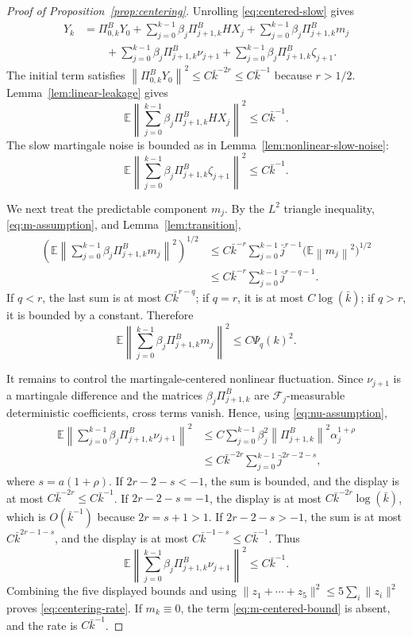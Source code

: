 \documentclass{article}
\newcommand{\E}{\mathbb{E}}
\newcommand{\norm}[1]{\left\lVert #1\right\rVert}
\begin{document}
\begin{proof}[Proof of Proposition~\ref{prop:centering}]
Unrolling \eqref{eq:centered-slow} gives
\begin{align*}
  Y_k
  &=\Pi^B_{0,k}Y_0
    +\sum_{j=0}^{k-1}\beta_j\Pi^B_{j+1,k}HX_j
    +\sum_{j=0}^{k-1}\beta_j\Pi^B_{j+1,k}m_j\\
  &\qquad
    +\sum_{j=0}^{k-1}\beta_j\Pi^B_{j+1,k}\nu_{j+1}
    +\sum_{j=0}^{k-1}\beta_j\Pi^B_{j+1,k}\zeta_{j+1}.
\end{align*}
The initial term satisfies $\norm{\Pi^B_{0,k}Y_0}^2\le C\bar k^{-2r}\le C\bar k^{-1}$ because $r>1/2$. Lemma~\ref{lem:linear-leakage} gives
\[
  \E\left\|\sum_{j=0}^{k-1}\beta_j\Pi^B_{j+1,k}HX_j\right\|^2\le C\bar k^{-1}.
\]
The slow martingale noise is bounded as in Lemma~\ref{lem:nonlinear-slow-noise}:
\[
  \E\left\|\sum_{j=0}^{k-1}\beta_j\Pi^B_{j+1,k}\zeta_{j+1}\right\|^2\le C\bar k^{-1}.
\]

We next treat the predictable component $m_j$. By the $L^2$ triangle inequality, \eqref{eq:m-assumption}, and Lemma~\ref{lem:transition},
\begin{align*}
  \left(\E\left\|\sum_{j=0}^{k-1}\beta_j\Pi^B_{j+1,k}m_j\right\|^2\right)^{1/2}
  &\le C\bar k^{-r}\sum_{j=0}^{k-1}\bar j^{r-1}\big(\E\norm{m_j}^2\big)^{1/2}\\
  &\le C\bar k^{-r}\sum_{j=0}^{k-1}\bar j^{r-q-1}.
\end{align*}
If $q<r$, the last sum is at most $C\bar k^{r-q}$; if $q=r$, it is at most $C\log(\bar k)$; if $q>r$, it is bounded by a constant. Therefore
\begin{equation}
  \E\left\|\sum_{j=0}^{k-1}\beta_j\Pi^B_{j+1,k}m_j\right\|^2
  \le C\Psi_q(k)^2. \label{eq:m-centered-bound}
\end{equation}

It remains to control the martingale-centered nonlinear fluctuation. Since $\nu_{j+1}$ is a martingale difference and the matrices $\beta_j\Pi^B_{j+1,k}$ are $\mathcal F_j$-measurable deterministic coefficients, cross terms vanish. Hence, using \eqref{eq:nu-assumption},
\begin{align*}
  \E\left\|\sum_{j=0}^{k-1}\beta_j\Pi^B_{j+1,k}\nu_{j+1}\right\|^2
  &\le C\sum_{j=0}^{k-1}\beta_j^2\norm{\Pi^B_{j+1,k}}^2\alpha_j^{1+\rho}\\
  &\le C\bar k^{-2r}\sum_{j=0}^{k-1}\bar j^{2r-2-s},
\end{align*}
where $s=a(1+\rho)$. If $2r-2-s<-1$, the sum is bounded, and the display is at most $C\bar k^{-2r}\le C\bar k^{-1}$. If $2r-2-s=-1$, the display is at most $C\bar k^{-2r}\log(\bar k)$, which is $O(\bar k^{-1})$ because $2r=s+1>1$. If $2r-2-s>-1$, the sum is at most $C\bar k^{2r-1-s}$, and the display is at most $C\bar k^{-1-s}\le C\bar k^{-1}$. Thus
\begin{equation}
  \E\left\|\sum_{j=0}^{k-1}\beta_j\Pi^B_{j+1,k}\nu_{j+1}\right\|^2
  \le C\bar k^{-1}. \label{eq:nu-centered-bound}
\end{equation}
Combining the five displayed bounds and using $\|z_1+\cdots+z_5\|^2\le5\sum_i\|z_i\|^2$ proves \eqref{eq:centering-rate}. If $m_k\equiv0$, the term \eqref{eq:m-centered-bound} is absent, and the rate is $C\bar k^{-1}$.
\end{proof}
\end{document}
